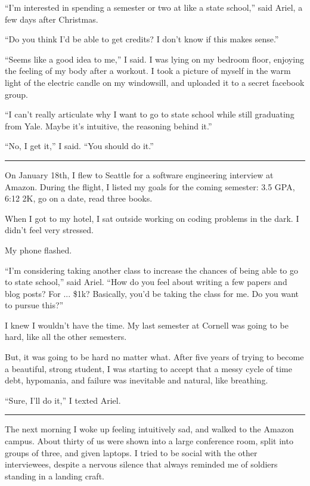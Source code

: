 ``I'm interested in spending a semester or two at like a state school,'' said
Ariel, a few days after Christmas.  

``Do you think I'd be able to get credits?  I don't know if this makes sense.''

``Seems like a good idea to me,'' I said.  I was lying on my bedroom floor,
enjoying the feeling of my body after a workout.  I took a picture of myself in
the warm light of the electric candle on my windowsill, and uploaded it to a
secret facebook group. 

``I can't really articulate why I want to go to state school while still
graduating from Yale.  Maybe it's intuitive, the reasoning behind it.'' 

``No, I get it,'' I said. ``You should do it.''

\plainfancybreak{12pt}{2}{}

On January 18th, I flew to Seattle for a software engineering interview at
Amazon.  During the flight, I listed my goals for the coming semester: 3.5 GPA,
6:12 2K, go on a date, read three books.  

When I got to my hotel, I sat outside working on coding problems in the dark.  I
didn't feel very stressed.

My phone flashed.

``I'm considering taking another class to increase the chances of being able to
go to state school,'' said Ariel.  ``How do you feel about writing a few papers
and blog posts?  For ... \$1k?  Basically, you'd be taking the class for me.  Do
you want to pursue this?'' 

I knew I wouldn't have the time.  My last semester at Cornell was going to be
hard, like all the other semesters. 

But, it was going to be hard no matter what.  After five years of trying to
become a beautiful, strong student, I was starting to accept that a messy cycle
of time debt, hypomania, and failure was inevitable and natural, like breathing.

``Sure, I'll do it,'' I texted Ariel.

\plainfancybreak{12pt}{2}{}

The next morning I woke up feeling intuitively sad, and walked to the Amazon
campus.  About thirty of us were shown into a large conference room, split into
groups of three, and given laptops.  I tried to be social with the other
interviewees, despite a nervous silence that always reminded me of soldiers
standing in a landing craft.

